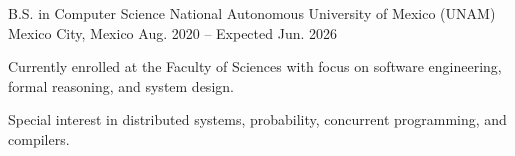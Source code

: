 \begin{cventries}
  \cventry
    {B.S. in Computer Science}
    {National Autonomous University of Mexico (UNAM)}
    {Mexico City, Mexico}
    {Aug. 2020 – Expected Jun. 2026}
    {
      \begin{cvitems}
        \item {Currently enrolled at the Faculty of Sciences with focus on software engineering, formal reasoning, and system design.}
        \item {Special interest in distributed systems, probability, concurrent programming, and compilers.}
      \end{cvitems}
    }
\end{cventries}
